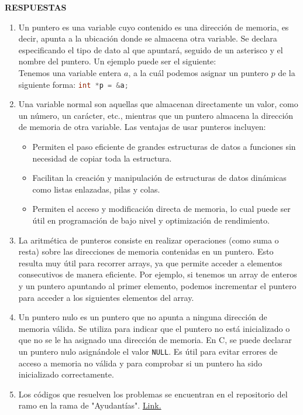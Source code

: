 \documentclass[12pt]{article}
\begin{document}
\newpage
\begin{center}
    \textbf{RESPUESTAS}
\end{center}

\begin{enumerate}
    \item Un puntero es una variable cuyo contenido es una dirección de memoria, es decir, apunta a la ubicación donde se almacena otra variable. Se declara especificando el tipo de dato al que apuntará, seguido de un asterisco y el nombre del puntero. Un ejemplo puede ser el siguiente: \\
    Tenemos una variable entera $a$, a la cuál podemos asignar un puntero $p$ de la siguiente forma: \lstinline[language=C]|int *p = &a;|

    \item Una variable normal son aquellas que almacenan directamente un valor, como un número, un carácter, etc., mientras que un puntero almacena la dirección de memoria de otra variable. Las ventajas de usar punteros incluyen:
    \begin{itemize}
        \item Permiten el paso eficiente de grandes estructuras de datos a funciones sin necesidad de copiar toda la estructura.
        \item Facilitan la creación y manipulación de estructuras de datos dinámicas como listas enlazadas, pilas y colas.
        \item Permiten el acceso y modificación directa de memoria, lo cual puede ser útil en programación de bajo nivel y optimización de rendimiento.
    \end{itemize}

    \item La aritmética de punteros consiste en realizar operaciones (como suma o resta) sobre las direcciones de memoria contenidas en un puntero. Esto resulta muy útil para recorrer arrays, ya que permite acceder a elementos consecutivos de manera eficiente. Por ejemplo, si tenemos un array de enteros y un puntero apuntando al primer elemento, podemos incrementar el puntero para acceder a los siguientes elementos del array.
    
    \item Un puntero nulo es un puntero que no apunta a ninguna dirección de memoria válida. Se utiliza para indicar que el puntero no está inicializado o que no se le ha asignado una dirección de memoria. En C, se puede declarar un puntero nulo asignándole el valor \lstinline[language=C]|NULL|. Es útil para evitar errores de acceso a memoria no válida y para comprobar si un puntero ha sido inicializado correctamente.
    
    \item Los códigos que resuelven los problemas se encuentran en el repositorio del ramo en la rama de "Ayudantías". \href{https://github.com/otrab/EDA/tree/Ayudant%C3%ADas}{Link.}
\end{enumerate}
\end{document}

